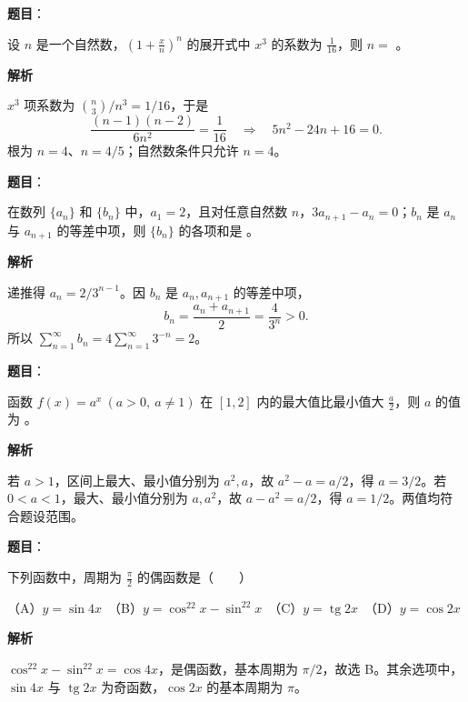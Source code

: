 \begin{answer}

\textbf{题目}：

设 $n$ 是一个自然数，$\left(1+\frac{x}{n}\right)^n$ 的展开式中 $x^3$ 的系数为 $\frac1{16}$，则 $n=$ \gkblank{}。

\textbf{解析}

$x^3$ 项系数为 $\binom n3/n^3=1/16$，于是
\nopagebreak[4]
\[
\frac{(n-1)(n-2)}{6n^2}=\frac1{16}
\quad\Longrightarrow\quad 5n^2-24n+16=0.
\]
根为 $n=4$、$n=4/5$；自然数条件只允许 $n=4$。


\end{answer}
\begin{answer}

\textbf{题目}：

在数列 $\{a_n\}$ 和 $\{b_n\}$ 中，$a_1=2$，且对任意自然数 $n$，$3a_{n+1}-a_n=0$；$b_n$ 是 $a_n$ 与 $a_{n+1}$ 的等差中项，则 $\{b_n\}$ 的各项和是 \gkblank{}。

\textbf{解析}

递推得 $a_n=2/3^{n-1}$。因 $b_n$ 是 $a_n,a_{n+1}$ 的等差中项，
\nopagebreak[4]
\[
b_n=\frac{a_n+a_{n+1}}2=\frac4{3^n}>0.
\]
所以 $\sum_{n=1}^\infty b_n=4\sum_{n=1}^\infty3^{-n}=2$。


\end{answer}
\begin{answer}

\textbf{题目}：

函数 $f(x)=a^x\ (a>0,\ a\ne1)$ 在 $[1,2]$ 内的最大值比最小值大 $\frac a2$，则 $a$ 的值为 \gkblank{}。

\textbf{解析}

若 $a>1$，区间上最大、最小值分别为 $a^2,a$，故 $a^2-a=a/2$，得 $a=3/2$。若 $0<a<1$，最大、最小值分别为 $a,a^2$，故 $a-a^2=a/2$，得 $a=1/2$。两值均符合题设范围。


\end{answer}
\begin{answer}

\textbf{题目}：

下列函数中，周期为 $\frac\pi2$ 的偶函数是\mbox{（　　）}

（A）$y=\sin4x$　（B）$y=\cos^22x-\sin^22x$　（C）$y=\operatorname{tg}2x$　（D）$y=\cos2x$

\textbf{解析}

$\cos^22x-\sin^22x=\cos4x$，是偶函数，基本周期为 $\pi/2$，故选 B。其余选项中，$\sin4x$ 与 $\operatorname{tg}2x$ 为奇函数，$\cos2x$ 的基本周期为 $\pi$。


\end{answer}
